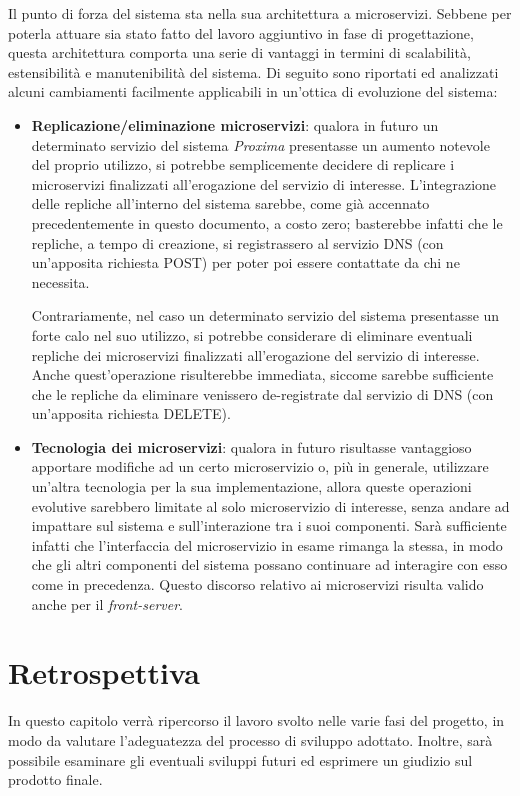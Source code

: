 \documentclass[a4paper,12pt]{report}
\begin{document}
Il punto di forza del sistema sta nella sua architettura a microservizi. Sebbene per poterla attuare sia stato fatto del lavoro aggiuntivo in fase di progettazione, questa architettura comporta una serie di vantaggi in termini di scalabilità, estensibilità e manutenibilità del sistema. Di seguito sono riportati ed analizzati alcuni cambiamenti facilmente applicabili in un'ottica di evoluzione del sistema:
\begin{itemize}
	\item \textbf{Replicazione/eliminazione microservizi}: qualora in futuro un determinato servizio del sistema \emph{Proxima} presentasse un aumento notevole del proprio utilizzo, si potrebbe semplicemente decidere di replicare i microservizi finalizzati all'erogazione del servizio di interesse. L'integrazione delle repliche all'interno del sistema sarebbe, come già accennato precedentemente in questo documento, a costo zero; basterebbe infatti che le repliche, a tempo di creazione, si registrassero al servizio DNS (con un'apposita richiesta POST) per poter poi essere contattate da chi ne necessita.
	
	Contrariamente, nel caso un determinato servizio del sistema presentasse un forte calo nel suo utilizzo, si potrebbe considerare di eliminare eventuali repliche dei microservizi finalizzati all'erogazione del servizio di interesse. Anche quest'operazione risulterebbe immediata, siccome sarebbe sufficiente che le repliche da eliminare venissero de-registrate dal servizio di DNS (con un'apposita richiesta DELETE).
	
	\item \textbf{Tecnologia dei microservizi}: qualora in futuro risultasse vantaggioso apportare modifiche ad un certo microservizio o, più in generale, utilizzare un'altra tecnologia per la sua implementazione, allora queste operazioni evolutive sarebbero limitate al solo microservizio di interesse, senza andare ad impattare sul sistema e sull'interazione tra i suoi componenti. Sarà sufficiente infatti che l'interfaccia del microservizio in esame rimanga la stessa, in modo che gli altri componenti del sistema possano continuare ad interagire con esso come in precedenza. Questo discorso relativo ai microservizi risulta valido anche per il \emph{front-server}.
\end{itemize}


\chapter{Retrospettiva}
In questo capitolo verrà ripercorso il lavoro svolto nelle varie fasi del progetto, in modo da valutare l'adeguatezza del processo di sviluppo adottato. Inoltre, sarà possibile esaminare gli eventuali sviluppi futuri ed esprimere un giudizio sul prodotto finale.
\end{document}
